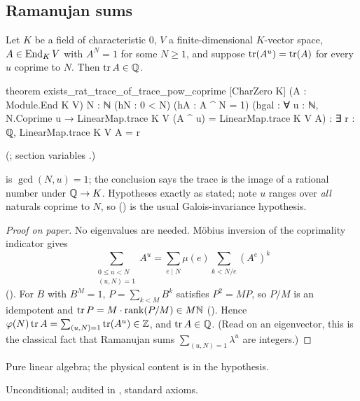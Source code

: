 \subsection{Ramanujan sums}

\begin{theorem}\label{ch22:thm:ramanujan}
Let $K$ be a field of characteristic $0$, $V$ a finite-dimensional $K$-vector space, $A\in\operatorname{End}_K V$ with $A^N=1$ for some
$N\ge1$, and suppose $\operatorname{tr}(A^u)=\operatorname{tr}(A)$ for every $u$ coprime to $N$.  Then $\operatorname{tr} A\in{\mathbb{Q}}$.
\end{theorem}
\begin{leancode}
theorem exists_rat_trace_of_trace_pow_coprime [CharZero K] (A : Module.End K V) {N : ℕ}
    (hN : 0 < N) (hA : A ^ N = 1)
    (hgal : ∀ u : ℕ, N.Coprime u → LinearMap.trace K V (A ^ u) = LinearMap.trace K V A) :
    ∃ r : ℚ, LinearMap.trace K V A = r
\end{leancode}
(; section variables
.)
\begin{dictionary}
 is $\gcd(N,u)=1$; the conclusion  says the trace is the image of a
rational number under ${\mathbb{Q}}\to K$.  Hypotheses exactly as stated; note $u$ ranges over \emph{all} naturals coprime to $N$, so
() is the usual Galois-invariance hypothesis.
\end{dictionary}
\begin{proof}[Proof on paper]
No eigenvalues are needed.  Möbius inversion of the coprimality indicator gives
\begin{equation*}
  \sum_{\substack{0\le u<N\\(u,N)=1}}A^u=\sum_{e\mid N}\mu(e)\sum_{k<N/e}(A^e)^k
\end{equation*}
().  For $B$ with $B^M=1$, $P=\sum_{k<M}B^k$ satisfies $P^2=MP$, so $P/M$ is
an idempotent and $\operatorname{tr} P=M\cdot\mathrm{rank}(P/M)\in M{\mathbb{N}}$ ().  Hence
$\varphi(N)\operatorname{tr} A=\sum_{(u,N)=1}\operatorname{tr}(A^u)\in{\mathbb{Z}}$, and $\operatorname{tr} A\in{\mathbb{Q}}$.  (Read on an eigenvector, this is the classical fact that
Ramanujan sums $\sum_{(u,N)=1}\lambda^u$ are integers.)
\end{proof}
\begin{physics}Pure linear algebra; the physical content is in the hypothesis.\end{physics}
\begin{status}Unconditional; audited in , standard axioms.\end{status}

